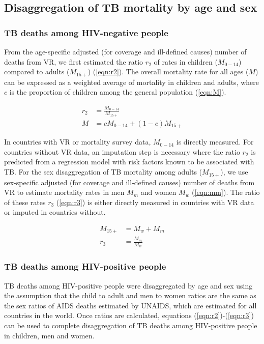 \subsection{Disaggregation of TB mortality by age and sex}

\subsubsection{TB deaths among HIV-negative people}

From the age-specific adjusted (for coverage and ill-defined causes) number of deaths from VR, we first estimated the ratio $r_2$ of rates in children ($M_{0-14}$) compared to adults ($M_{15+}$) (\ref{eqn:r2}). The overall mortality rate for all ages ($M$) can be expressed as a weighted average of mortality in children and adults, where $c$ is the proportion of children among the general population (\ref{eqn:M}).

\begin{equation}
\begin{align}
r_2 &= \frac{M_{0-14}}{M_{15+}} \label{eqn:r2} \\
M &= c M_{0-14} + (1 - c) M_{15+} \label{eqn:M}
\end{align}
\end{equation}

In countries with VR or mortality survey data, $M_{0-14}$ is directly measured. For countries without VR data, an imputation step is necessary where the ratio $r_2$ is predicted from a regression model with risk factors known to be associated with TB. For the sex disaggregation of TB mortality among adults ($M_{15+}$), we use sex-specific adjusted (for coverage and ill-defined causes) number of deaths from VR to estimate mortality rates in men $M_m$  and women $M_w$ (\ref{eqn:mm}). The ratio of these rates $r_3$ (\ref{eqn:r3}) is either directly measured in countries with VR data or imputed in countries without.

\begin{equation}
\begin{align}
M_{15+} &= M_w + M_m \label{eqn:mm} \\
r_3 &= \frac{M_m}{M_w} \label{eqn:r3}
\end{align}
\end{equation}


\subsubsection{TB deaths among HIV-positive people}

TB deaths among HIV-positive people were disaggregated by age and sex using the assumption that the child to adult and men to women ratios are the same as the sex ratios of AIDS deaths estimated by UNAIDS, which are estimated for all countries in the world. Once ratios are calculated, equations (\ref{eqn:r2})-(\ref{eqn:r3}) can be used to complete disaggregation of TB deaths among HIV-positive people in children, men and women.
